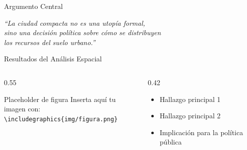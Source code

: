 \begin{frame}{Argumento Central}
  \vfill
  \begin{center}
    \color{ColorPrincipal}
    \Large\itshape
    ``La ciudad compacta no es una utopía formal,\\
    sino una decisión política sobre cómo se distribuyen\\
    los recursos del suelo urbano.''
  \end{center}
  \vfill
\end{frame}

\begin{frame}{Resultados del Análisis Espacial}
  \begin{columns}[T]
    \begin{column}{0.55\textwidth}

      \begin{alertblock}{Placeholder de figura}
        Inserta aquí tu imagen con:\\
        \texttt{\textbackslash includegraphics\{img/figura.png\}}
      \end{alertblock}
    \end{column}
    \begin{column}{0.42\textwidth}
      \begin{itemize}
        \item Hallazgo principal 1 
        \item Hallazgo principal 2
        \item Implicación para la política pública
      \end{itemize}
    \end{column}
  \end{columns}
\end{frame}

